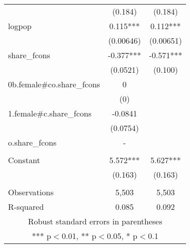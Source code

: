 \documentclass[]{article}
\begin{document}
\begin{tabular}{lcc}
 & (0.184) & (0.184) \\
logpop & 0.115*** & 0.112*** \\
 & (0.00646) & (0.00651) \\
share\_fcons & -0.377*** & -0.571*** \\
 & (0.0521) & (0.100) \\
0b.female\#co.share\_fcons & 0 &  \\
 & (0) &  \\
1.female\#c.share\_fcons & -0.0841 &  \\
 & (0.0754) &  \\
o.share\_fcons & - &  \\
 &  &  \\
Constant & 5.572*** & 5.627*** \\
 & (0.163) & (0.163) \\
 &  &  \\
Observations & 5,503 & 5,503 \\
 R-squared & 0.085 & 0.092 \\ \hline
\multicolumn{3}{c}{ Robust standard errors in parentheses} \\
\multicolumn{3}{c}{ *** p$<$0.01, ** p$<$0.05, * p$<$0.1} \\
\end{tabular}
\end{document}
